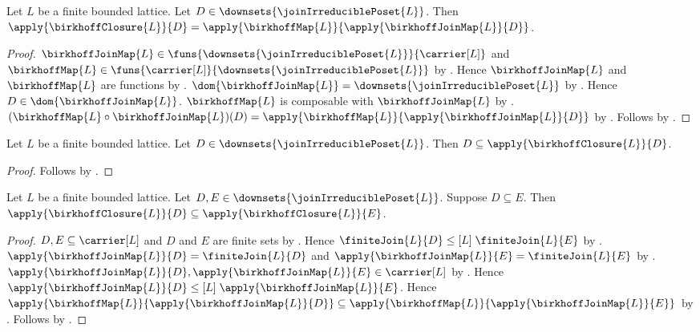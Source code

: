 \begin{proposition}\label{birkhoff_closure_apply}
    Let $L$ be a finite bounded lattice.
    Let $D\in\downsets{\joinIrreduciblePoset{L}}$.
    Then $\apply{\birkhoffClosure{L}}{D}
        =\apply{\birkhoffMap{L}}{\apply{\birkhoffJoinMap{L}}{D}}$.
\end{proposition}
\begin{proof}
    $\birkhoffJoinMap{L}\in
        \funs{\downsets{\joinIrreduciblePoset{L}}}{\carrier[L]}$ and
        $\birkhoffMap{L}\in
        \funs{\carrier[L]}{\downsets{\joinIrreduciblePoset{L}}}$ by
        .
    Hence $\birkhoffJoinMap{L}$ and $\birkhoffMap{L}$ are functions by
        .
    $\dom{\birkhoffJoinMap{L}}
        =\downsets{\joinIrreduciblePoset{L}}$ by .
    Hence $D\in\dom{\birkhoffJoinMap{L}}$.
    $\birkhoffMap{L}$ is composable with $\birkhoffJoinMap{L}$ by
        .
    $(\birkhoffMap{L}\circ\birkhoffJoinMap{L})(D)
        =\apply{\birkhoffMap{L}}{\apply{\birkhoffJoinMap{L}}{D}}$ by
        .
    Follows by .
\end{proof}

\begin{proposition}\label{birkhoff_closure_extensive}
    Let $L$ be a finite bounded lattice.
    Let $D\in\downsets{\joinIrreduciblePoset{L}}$.
    Then $D\subseteq\apply{\birkhoffClosure{L}}{D}$.
\end{proposition}
\begin{proof}
    Follows by
        .
\end{proof}

\begin{proposition}\label{birkhoff_closure_monotone}
    Let $L$ be a finite bounded lattice.
    Let $D,E\in\downsets{\joinIrreduciblePoset{L}}$.
    Suppose $D\subseteq E$.
    Then $\apply{\birkhoffClosure{L}}{D}
        \subseteq\apply{\birkhoffClosure{L}}{E}$.
\end{proposition}
\begin{proof}
    $D,E\subseteq\carrier[L]$ and $D$ and $E$ are finite sets by
        .
    Hence $\finiteJoin{L}{D}\mathrel{\leq[L]}\finiteJoin{L}{E}$ by
        .
    $\apply{\birkhoffJoinMap{L}}{D}=\finiteJoin{L}{D}$ and
        $\apply{\birkhoffJoinMap{L}}{E}=\finiteJoin{L}{E}$ by
        .
    $\apply{\birkhoffJoinMap{L}}{D},
        \apply{\birkhoffJoinMap{L}}{E}\in\carrier[L]$ by
        .
    Hence $\apply{\birkhoffJoinMap{L}}{D}
        \mathrel{\leq[L]}\apply{\birkhoffJoinMap{L}}{E}$.
    Hence $\apply{\birkhoffMap{L}}{\apply{\birkhoffJoinMap{L}}{D}}
        \subseteq
        \apply{\birkhoffMap{L}}{\apply{\birkhoffJoinMap{L}}{E}}$ by
        .
    Follows by .
\end{proof}

